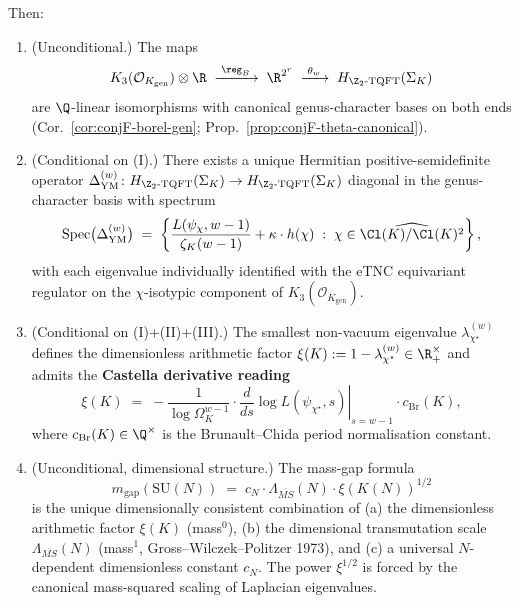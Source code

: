 \begin{theorem}
\smallskip Then:
\begin{enumerate}[label=\textup{(\Alph*)}, leftmargin=*]
\item {\rm (Unconditional.)}  The maps
   \[
   K_3(\mathcal{O}_{K_{\mathrm{gen}}}) \otimes \R
   \;\xrightarrow{\;\reg_B\;}\; \R^{2^r}
   \;\xrightarrow{\;\theta_w\;}\; H_{\Z_2\text{-}\mathrm{TQFT}}(\Sigma_K)
   \]
   are $\Q$-linear isomorphisms with canonical genus-character bases
   on both ends
   \textup{(}Cor.~\ref{cor:conjF-borel-gen};
   Prop.~\ref{prop:conjF-theta-canonical}\textup{)}.
\item {\rm (Conditional on (I).)}  There exists a unique Hermitian
   positive-semidefinite operator
   $\Delta_{\mathrm{YM}}^{(w)} \colon H_{\Z_2\text{-}\mathrm{TQFT}}(\Sigma_K)
   \to H_{\Z_2\text{-}\mathrm{TQFT}}(\Sigma_K)$
   diagonal in the genus-character basis with spectrum
   \[
   \mathrm{Spec}\bigl(\Delta_{\mathrm{YM}}^{(w)}\bigr) \;=\;
   \left\{\frac{L(\psi_\chi, w-1)}{\zeta_K(w-1)} + \kappa \cdot h(\chi)
   \;:\; \chi \in \widehat{\Cl(K)/\Cl(K)^2}\right\},
   \]
   with each eigenvalue individually identified with the eTNC
   equivariant regulator on the $\chi$-isotypic component of
   $K_3(\mathcal{O}_{K_{\mathrm{gen}}})$.
\item {\rm (Conditional on (I)+(II)+(III).)}  The smallest non-vacuum
   eigenvalue $\lambda_{\chi^\star}^{(w)}$ defines the dimensionless
   arithmetic factor
   $\xi(K) := 1 - \lambda_{\chi^\star}^{(w)} \in \R^\times_+$
   and admits the {\bf Castella derivative reading}
   \[
   \xi(K) \;=\; -\frac{1}{\log \Omega_K^{w-1}} \cdot
   \left.\frac{d}{ds}\log L(\psi_{\chi^\star}, s)\right|_{s = w-1}
   \cdot c_{\mathrm{Br}}(K),
   \]
   where $c_{\mathrm{Br}}(K) \in \Q^\times$ is the Brunault--Chida
   period normalisation constant.
\item {\rm (Unconditional, dimensional structure.)}  The mass-gap
   formula
   \[
   m_{\mathrm{gap}}(\mathrm{SU}(N)) \;=\; c_N \cdot \Lambda_{\overline{MS}}(N)
   \cdot \xi(K(N))^{1/2}
   \]
   is the unique dimensionally consistent combination of
   \textup{(}a\textup{)} the dimensionless arithmetic factor $\xi(K)$
   \textup{(}mass$^0$\textup{)},
   \textup{(}b\textup{)} the dimensional transmutation scale
   $\Lambda_{\overline{MS}}(N)$ \textup{(}mass$^1$, Gross--Wilczek--Politzer
   1973\textup{)}, and
   \textup{(}c\textup{)} a universal $N$-dependent dimensionless constant
   $c_N$.  The power $\xi^{1/2}$ is forced by the canonical mass-squared
   scaling of Laplacian eigenvalues.
\end{enumerate}
\end{theorem}

